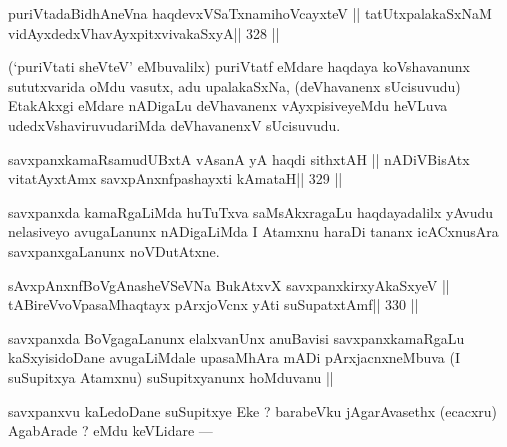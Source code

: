 \begin{shl}
puriVtadaBidhAneVna haqdevxVSaTxnamihoVcayxteV ||
tatUtxpalakaSxNaM vidAyxdedxVhavAyxpitxvivakaSxyA\hfill || 328 ||
\end{shl}

\begin{artha}
(`puriVtati sheVteV' eMbuvalilx) puriVtatf eMdare haqdaya koVshavanunx 
sututxvarida oMdu vasutx, adu upalakaSxNa, (deVhavanenx sUcisuvudu) EtakAkxgi eMdare nADigaLu deVhavanenx vAyxpisiveyeMdu heVLuva udedxVshaviruvudariMda deVhavanenxV sUcisuvudu.
\end{artha}

\begin{shl}
savxpanxkamaRsamudUBxtA vAsanA yA haqdi sithxtAH ||
nADiVBisAtx vitatAyx\s\s tAmx savxpAnxnfpashayxti  kAmataH\hfill || 329 ||
\end{shl}

\begin{artha}
savxpanxda kamaRgaLiMda huTuTxva saMsAkxragaLu haqdayadalilx yAvudu nelasiveyo avugaLanunx nADigaLiMda I Atamxnu haraDi tananx icACxnusAra savxpanxgaLanunx noVDutAtxne.
\end{artha}

\begin{shl}
sAvxpAnxnfBoVgAnasheVSeVNa BukAtxvX savxpanxkirxyAkaSxyeV ||
\footnotemark[6]tABireVvoVpasaMhaqtayx pArxjoVcnx yAti suSupatxtAmf\hfill || 330 ||
\end{shl}

\begin{artha}
savxpanxda BoVgagaLanunx elalxvanUnx anuBavisi savxpanxkamaRgaLu 
kaSxyisidoDane avugaLiMdale upasaMhAra mADi pArxjacnxneMbuva (I suSupitxya Atamxnu) suSupitxyanunx hoMduvanu ||
\end{artha}

\begin{artha}
savxpanxvu kaLedoDane suSupitxye Eke ? barabeVku jAgarAvasethx (ecacxru) AgabArade ? eMdu keVLidare ---
\end{artha}

